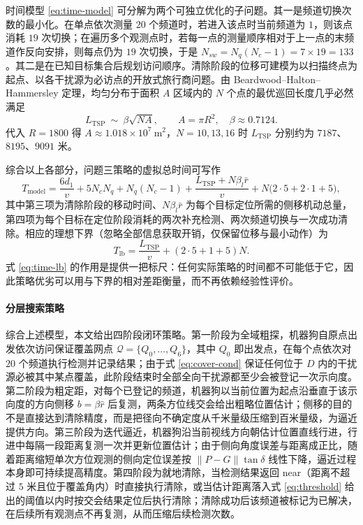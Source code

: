 时间模型 \eqref{eq:time-model} 可分解为两个可独立优化的子问题。其一是频道切换次数的最小化。在单点依次测量 $20$ 个频道时，若进入该点时当前频道为 $1$，则该点消耗 $19$ 次切换；在遍历多个观测点时，若每一点的测量顺序相对于上一点的末频道作反向安排，则每点仍为 $19$ 次切换，于是 $N_{sw}=N_q(N_c-1)=7\times19=133$。其二是在已知目标集合后规划访问顺序。清除阶段的位移可建模为以扫描终点为起点、以各干扰源为必访点的开放式旅行商问题。由 Beardwood--Halton--Hammersley 定理，均匀分布于面积 $A$ 区域内的 $N$ 个点的最优巡回长度几乎必然满足
\begin{equation}
L_{\mathrm{TSP}}\ \sim\ \beta\sqrt{NA},\qquad A=\pi R^2,\quad \beta\approx0.7124 .
\label{eq:bhh}
\end{equation}
代入 $R=1800$ 得 $A\approx1.018\times10^7\ \text{m}^2$，$N=10,13,16$ 时 $L_{\mathrm{TSP}}$ 分别约为 $7187$、$8195$、$9091$ 米。

综合以上各部分，问题三策略的虚拟总时间可写作
\begin{equation}
T_{\mathrm{model}}=\frac{6d_1}{v}+5N_cN_q+N_q(N_c-1)
+\frac{L_{\mathrm{TSP}}+N\beta_l\bar r}{v}
+N\bigl(2\cdot5+2\cdot1+5\bigr),
\label{eq:time-total}
\end{equation}
其中第三项为清除阶段的移动时间、$N\beta_l\bar r$ 为每个目标定位所需的侧移机动总量，第四项为每个目标在定位阶段消耗的两次补充检测、两次频道切换与一次成功清除。相应的理想下界（忽略全部信息获取开销，仅保留位移与最小动作）为
\begin{equation}
T_{\mathrm{lb}}=\frac{L_{\mathrm{TSP}}}{v}+(2\cdot5+1+5)N .
\label{eq:time-lb}
\end{equation}
式 \eqref{eq:time-lb} 的作用是提供一把标尺：任何实际策略的时间都不可能低于它，因此策略优劣可以用与下界的相对差距衡量，而不再依赖经验性评价。

\paragraph{分层搜索策略} 综合上述模型，本文给出四阶段闭环策略。第一阶段为全域粗探，机器狗自原点出发依次访问保证覆盖网点 $\mathcal Q=\{Q_0,\dots,Q_6\}$，其中 $Q_0$ 即出发点，在每个点依次对 $20$ 个频道执行检测并记录结果；由于式 \eqref{eq:cover-cond} 保证任何位于 $D$ 内的干扰源必被其中某点覆盖，此阶段结束时全部全向干扰源都至少会被登记一次示向度。第二阶段为粗定距，对每个已登记的频道，机器狗以当前位置为起点沿垂直于该示向度的方向侧移 $b=\beta\hat r$ 后复测，两条方位线交会给出粗略位置估计；侧移的目的不是直接达到清除精度，而是把径向不确定度从千米量级压缩到百米量级，为逼近提供方向。第三阶段为迭代逼近，机器狗沿当前视线方向朝估计位置直线行进，行进中每隔一段距离复测一次并更新位置估计；由于侧向角度误差与距离成正比，随着距离缩短单次方位观测的侧向定位误差按 $\lVert P-G\rVert\tan\delta$ 线性下降，逼近过程本身即可持续提高精度。第四阶段为就地清除，当检测结果返回 near（距离不超过 $5$ 米且位于覆盖角内）时直接执行清除，或当估计距离落入式 \eqref{eq:threshold} 给出的阈值以内时按交会结果定位后执行清除；清除成功后该频道被标记为已解决，在后续所有观测点不再复测，从而压缩后续检测次数。


